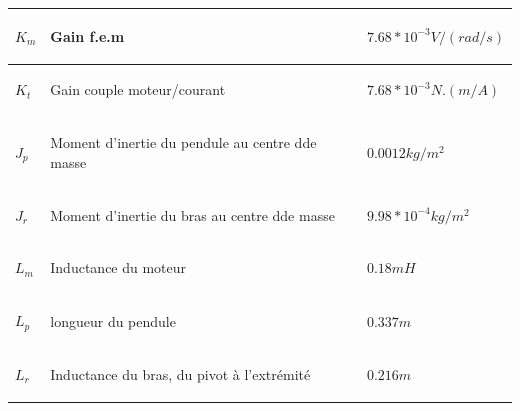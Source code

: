 \documentclass[12pt, a4paper, openany]{report}
\begin{document}
\begin{center}
\begin{tabular}{|R{2cm}|C{8cm}|L{2.5cm}|}
\hline  \begin{center} $K_{m}$\end{center}  &  \begin{center}Gain f.e.m\end{center}  & \begin{center}$7.68*10^{-3} V/(rad/s)$ \end{center} \\
\hline  \begin{center} $K_{t}$\end{center}  &  \begin{center}Gain couple moteur/courant\end{center}  & \begin{center}$7.68*10^{-3} N.(m/A)$ \end{center}\\
\hline  \begin{center} $J_{p}$\end{center}  &  \begin{center}Moment d'inertie du pendule au centre dde masse \end{center}  & \begin{center}$0.0012 kg/m^{2}$ \end{center}\\
\hline  \begin{center} $J_{r}$\end{center}  &  \begin{center}Moment d'inertie du bras au centre dde masse \end{center}  & \begin{center}$9.98*10^{-4} kg/m^{2}$ \end{center}\\
\hline  \begin{center} $L_{m}$\end{center}  &  \begin{center} Inductance du moteur \end{center}  & \begin{center}$0.18 mH$ \end{center}\\
\hline  \begin{center} $L_{p}$\end{center}  &  \begin{center} longueur du pendule \end{center}  & \begin{center}$0.337 m$ \end{center}\\
\hline  \begin{center} $L_{r}$\end{center}  &  \begin{center} Inductance du bras, du pivot à l'extrémité \end{center}  & \begin{center}$0.216 m$ \end{center}\\

\end{tabular}
\end{center}
\end{document}
